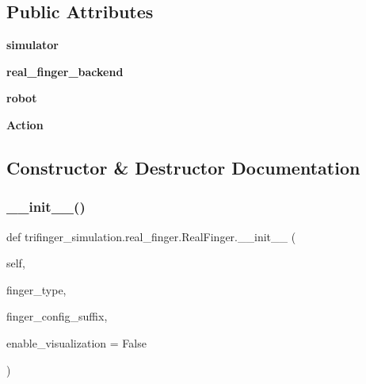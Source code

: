 \subsection*{Public Attributes}
\begin{DoxyCompactItemize}
\item 
\mbox{\label{classtrifinger__simulation_1_1real__finger_1_1RealFinger_ac89964cae309710fc2dda9a5db859e19}} 
{\bfseries simulator}
\item 
\mbox{\label{classtrifinger__simulation_1_1real__finger_1_1RealFinger_a202d50223d0724b8478a8a675b881fc1}} 
{\bfseries real\+\_\+finger\+\_\+backend}
\item 
\mbox{\label{classtrifinger__simulation_1_1real__finger_1_1RealFinger_a4d76b5b82c37f49075e0e84177b27967}} 
{\bfseries robot}
\item 
\mbox{\label{classtrifinger__simulation_1_1real__finger_1_1RealFinger_ab9c79d41e501ae1e9478cf5417d23334}} 
{\bfseries Action}
\end{DoxyCompactItemize}


\subsection{Constructor \& Destructor Documentation}
\mbox{\label{classtrifinger__simulation_1_1real__finger_1_1RealFinger_ac439b679344398a9ea05e8dbe2b4d9e4}} 
\subsubsection{\texorpdfstring{\+\_\+\+\_\+init\+\_\+\+\_\+()}{\_\_init\_\_()}}
{\footnotesize\ttfamily def trifinger\+\_\+simulation.\+real\+\_\+finger.\+Real\+Finger.\+\_\+\+\_\+init\+\_\+\+\_\+ (\begin{DoxyParamCaption}\item[{}]{self,  }\item[{}]{finger\+\_\+type,  }\item[{}]{finger\+\_\+config\+\_\+suffix,  }\item[{}]{enable\+\_\+visualization = {\ttfamily False} }\end{DoxyParamCaption})}




